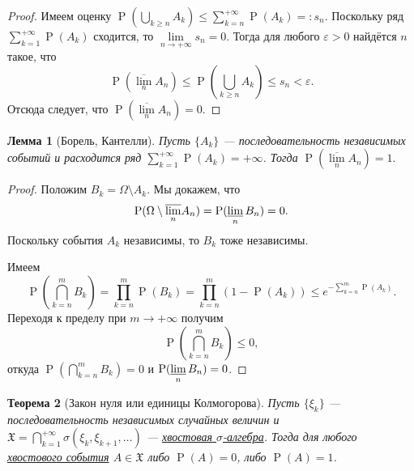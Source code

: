 \documentclass[12pt]{article}
\newtheorem{theorem}{Теорема}
\newtheorem{lemma}[theorem]{Лемма}
\numberwithin{theorem}{section}
\theoremstyle{definition}
\newcommand{\prob}{\operatorname{P}}
\begin{document}
	\begin{proof}
		Имеем оценку $ \prob(\bigcup\limits_{k \geqslant n} A_k) \leqslant \sum\limits_{k = n}^{+\infty}\prob (A_k) =: s_n $.
		Поскольку ряд $ \sum\limits_{k = 1}^{+\infty}\prob (A_k) $ сходится, то $ \lim\limits_{n \to +\infty} s_n = 0 $.
		Тогда для любого $ \varepsilon > 0 $ найдётся $ n $ такое, что 
		$$ \prob(\overline{\lim\limits_{n}} A_n)
		\leqslant \prob(\bigcup\limits_{k \geqslant n} A_k) \leqslant s_n < \varepsilon. $$
		Отсюда следует, что $ \prob(\overline{\lim\limits_{n}} A_n) = 0 $.
	\end{proof}
	
	\begin{lemma}[Борель, Кантелли]
		Пусть $ \{A_k\} $ --- последовательность независимых событий
		и расходится ряд $ \sum\limits_{k = 1}^{+\infty}\prob (A_k) = +\infty $.
		Тогда $ \prob(\overline{\lim\limits_{n}} A_n) = 1. $
	\end{lemma}
	
	\begin{proof}
		Положим $ B_k = \Omega \setminus A_k $.
		Мы докажем, что $$ \prob(\Omega \setminus \overline{\lim\limits_{n}} A_n)
		= \prob(\varliminf\limits_{n} B_n) = 0. $$
		Поскольку события $ A_k $ независимы, то $ B_k $ тоже независимы.
		
		Имеем $$ \prob(\bigcap\limits_{k = n}^{m} B_k) = \prod\limits_{k = n}^{m} \prob(B_k) 
		= \prod\limits_{k = n}^{m} (1 - \prob(A_k)) \leqslant e^{-\sum\limits_{k = n}^{m} \prob(A_k)}. $$
		Переходя к пределу при $ m \to +\infty $
		получим 
		$$ \prob(\bigcap\limits_{k = n}^{m} B_k) \leqslant 0, $$
		откуда $ \prob(\bigcap\limits_{k = n}^{m} B_k) = 0 $ и $ \prob(\varliminf\limits_{n} B_n) = 0 $.
	\end{proof}
	
	\begin{theorem}[Закон нуля или единицы Колмогорова] \label{zero one law}
		Пусть $ \{\xi_k\} $ --- последовательность независимых случайных величин
		и $ \mathfrak{X} = \bigcap\limits_{k = 1}^{+\infty} \sigma(\xi_k, \xi_{k + 1}, \ldots) $
		--- \hyperlink{tail-sigma-algebra}{хвостовая $ \sigma $-алгебра}.
		Тогда для любого \hyperlink{tail-event}{хвостового события} $ A \in \mathfrak{X} $ либо $ \prob(A) = 0 $, либо $ \prob(A) = 1 $.
	\end{theorem}
	
\end{document}
